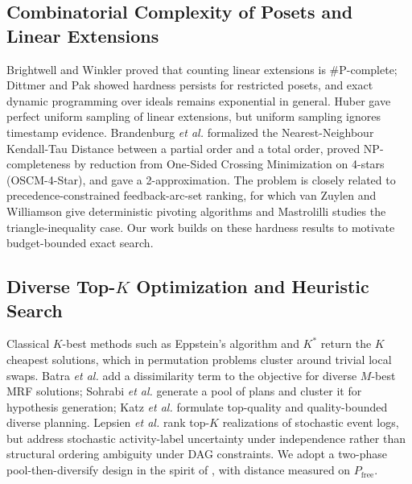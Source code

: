 \documentclass{ieeeaccess}
\newcommand{\Pfree}{P_{\mathrm{free}}}
\begin{document}
\subsection{Combinatorial Complexity of Posets and Linear Extensions}
Brightwell and Winkler \cite{Brightwell1991} proved that counting linear extensions is $\#$P-complete; Dittmer and Pak \cite{Dittmer2020} showed hardness persists for restricted posets, and exact dynamic programming over ideals \cite{Kangas2016} remains exponential in general. Huber \cite{Huber2006} gave perfect uniform sampling of linear extensions, but uniform sampling ignores timestamp evidence. Brandenburg \emph{et al.} \cite{Brandenburg2011} formalized the Nearest-Neighbour Kendall-Tau Distance between a partial order and a total order, proved NP-completeness by reduction from One-Sided Crossing Minimization on 4-stars (OSCM-4-Star), and gave a 2-approximation. The problem is closely related to precedence-constrained feedback-arc-set ranking, for which van Zuylen and Williamson \cite{vanZuylen2009} give deterministic pivoting algorithms and Mastrolilli \cite{Mastrolilli2011} studies the triangle-inequality case. Our work builds on these hardness results to motivate budget-bounded exact search.

\subsection{Diverse Top-$K$ Optimization and Heuristic Search}
Classical $K$-best methods such as Eppstein's algorithm \cite{Eppstein1998} and $K^*$ \cite{Aljazzar2011} return the $K$ cheapest solutions, which in permutation problems cluster around trivial local swaps. Batra \emph{et al.} \cite{Batra2012} add a dissimilarity term to the objective for diverse $M$-best MRF solutions; Sohrabi \emph{et al.} \cite{Sohrabi2016} generate a pool of plans and cluster it for hypothesis generation; Katz \emph{et al.} \cite{Katz2020,Katz2022} formulate top-quality and quality-bounded diverse planning. Lepsien \emph{et al.} \cite{Lepsien2024} rank top-$K$ realizations of stochastic event logs, but address stochastic activity-label uncertainty under independence rather than structural ordering ambiguity under DAG constraints. We adopt a two-phase pool-then-diversify design in the spirit of \cite{Sohrabi2016,Katz2020}, with distance measured on $\Pfree$.
\end{document}
